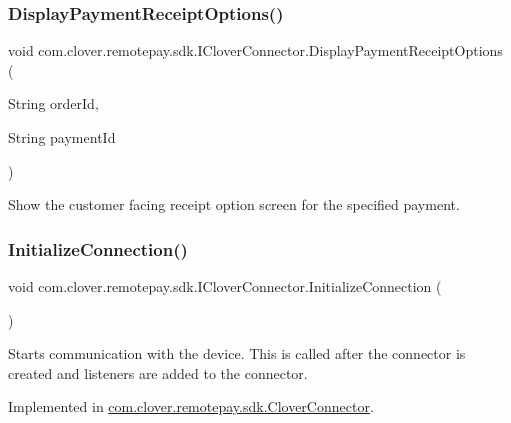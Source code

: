 \subsubsection{\texorpdfstring{Display\+Payment\+Receipt\+Options()}{DisplayPaymentReceiptOptions()}}
{\footnotesize\ttfamily void com.\+clover.\+remotepay.\+sdk.\+I\+Clover\+Connector.\+Display\+Payment\+Receipt\+Options (\begin{DoxyParamCaption}\item[{String}]{order\+Id,  }\item[{String}]{payment\+Id }\end{DoxyParamCaption})}



Show the customer facing receipt option screen for the specified payment. 

\mbox{\label{interfacecom_1_1clover_1_1remotepay_1_1sdk_1_1_i_clover_connector_a83c29b3d3a85f95c554a8464295acdb0}} 
\subsubsection{\texorpdfstring{Initialize\+Connection()}{InitializeConnection()}}
{\footnotesize\ttfamily void com.\+clover.\+remotepay.\+sdk.\+I\+Clover\+Connector.\+Initialize\+Connection (\begin{DoxyParamCaption}{ }\end{DoxyParamCaption})}



Starts communication with the device. This is called after the connector is created and listeners are added to the connector. 



Implemented in \hyperlink{classcom_1_1clover_1_1remotepay_1_1sdk_1_1_clover_connector_ae103900f25165ad063e914698e0aeb5d}{com.\+clover.\+remotepay.\+sdk.\+Clover\+Connector}.

\mbox{\label{interfacecom_1_1clover_1_1remotepay_1_1sdk_1_1_i_clover_connector_af4e56b0504d5e26d2953b5544bd8cf05}} 
